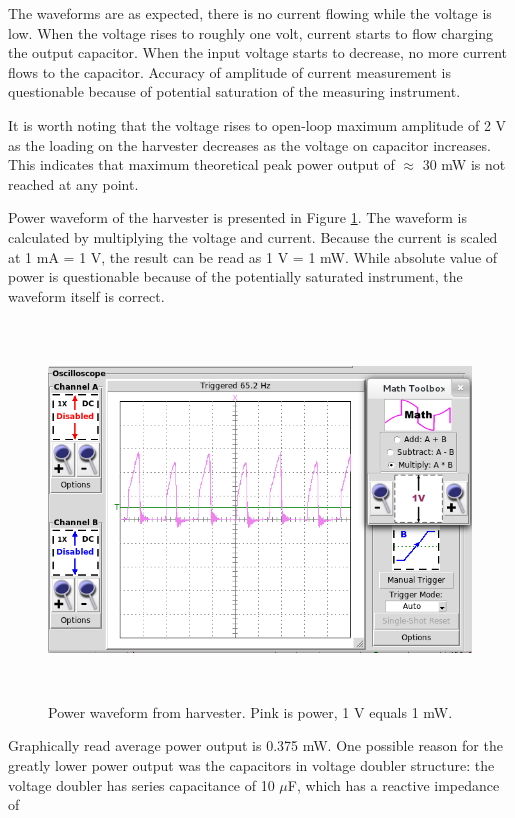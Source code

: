 The waveforms are as expected, there is no current flowing while the voltage is low. When the voltage rises to roughly one volt, current starts to flow charging the output capacitor. When the input voltage starts to decrease, no more current flows to the capacitor. Accuracy of amplitude of current measurement is questionable because of potential saturation of the measuring instrument.

It is worth noting that the voltage rises to open-loop maximum amplitude of 2 V as the loading on the harvester decreases as the voltage on capacitor increases. This indicates that maximum theoretical peak power output of $\approx$ 30 mW is not reached at any point. 

Power waveform of the harvester is presented in Figure \ref{fig:inductive_power_65}. The waveform is calculated by multiplying the voltage and current. Because the current is scaled at 1 mA = 1 V, the result can be read as 1 V = 1 mW. While absolute value of power is questionable because of the potentially saturated instrument, the waveform itself is correct.  

\begin{figure}[htb]
\begin{center}
\includegraphics[height=10cm]{images/own_measurement/generator_shaker/inductive_td_harvesting_power_65Hz_ferro.png}
\end{center}
\caption{\label{fig:inductive_power_65} Power waveform from harvester. Pink is power, 1 V equals 1 mW.}
\end{figure}

Graphically read average power output is 0.375 mW. One possible reason for the greatly lower power output was the capacitors in voltage doubler structure: the voltage doubler has series capacitance of 10 $\mu$F, which has a reactive impedance of

